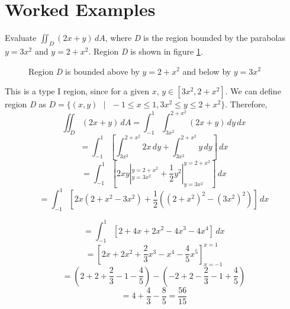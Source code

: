 \section{Worked Examples}

\begin{Worked}
\begin{Problem}
Evaluate $\iint_{\textit{D}} (2x + y)\,dA$, where \textit{D}
is the region bounded by the parabolas $y = 3x^2$ and $y = 2 + x^2$. Region 
\textit{D} is shown in figure \ref{fig:parabola}. 

\begin{figure}[H]
\centering
    \caption{Region \textit{D} is bounded above by $y = 2 + x^2$ and below by 
    $y = 3x^2$}
    \label{fig:parabola}
\end{figure}
\end{Problem}
\begin{Solution}
This is a type I region, since for a given $x$, $y \in \left[
3x^2, 2 + x^2 \right]$. We can define region \textit{D} as $\textit{D} = \{(x, 
y) \text{ }|\text{ } -1 \leq x \leq 1, 3x^2 \leq y \leq 2 + x^2 \}$. Therefore, 
$$\iint_{\textit{D}} (2x + y)\,dA = \int_{-1}^1 \int_{3x^2}^{2 + x^2} \left(2x 
+ y \right)\,dy\,dx$$
$$= \int_{-1}^1 \left[ \int_{3x^2}^{2 + x^2} 2x\,dy + \int_{3x^2}^{2 + x^2} y
\,dy \right]\,dx$$
$$= \int_{-1}^{1} \left[ 2xy|_{y = 3x^2}^{y = 2 + x^2} + \frac{1}{2}y^2|_{y = 
3x^2}^{y = 2+x^2} \right]\,dx$$
$$= \int_{-1}^1 \left[ 2x \left( 2 + x^2 - 3x^2 \right) + \frac{1}{2} \left( 
(2 + x^2)^2 - (3x^2)^2 \right) \right]\,dx$$

$$= \int_{-1}^1 \left[ 2 + 4x + 2x^2 - 4x^3 - 4x^4 \right]\,dx$$
$$= \left[ 2x + 2x^2 + \frac{2}{3}x^3 - x^4 - \frac{4}{5}x^5 \right]_{x = -1}^{
x = 1}$$
$$= \left( 2 + 2 + \frac{2}{3} - 1 - \frac{4}{5} \right) - \left( -2 + 2 - 
\frac{2}{3} - 1 + \frac{4}{5} \right)$$
$$= 4 + \frac{4}{3} - \frac{8}{5} = \frac{56}{15}$$
\end{Solution}
\end{Worked}


